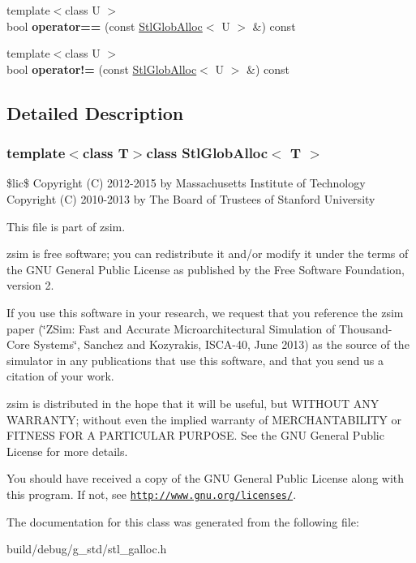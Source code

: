\begin{DoxyCompactItemize}
\item 
\hypertarget{classStlGlobAlloc_af3c45b58386a804323f79d1664b8641c}{{\footnotesize template$<$class U $>$ }\\bool {\bfseries operator==} (const \hyperlink{classStlGlobAlloc}{Stl\-Glob\-Alloc}$<$ U $>$ \&) const }\label{classStlGlobAlloc_af3c45b58386a804323f79d1664b8641c}

\item 
\hypertarget{classStlGlobAlloc_abf98d4b1fd59bc77b1ecbe82c2917520}{{\footnotesize template$<$class U $>$ }\\bool {\bfseries operator!=} (const \hyperlink{classStlGlobAlloc}{Stl\-Glob\-Alloc}$<$ U $>$ \&) const }\label{classStlGlobAlloc_abf98d4b1fd59bc77b1ecbe82c2917520}

\end{DoxyCompactItemize}


\subsection{Detailed Description}
\subsubsection*{template$<$class T$>$class Stl\-Glob\-Alloc$<$ T $>$}

\$lic\$ Copyright (C) 2012-\/2015 by Massachusetts Institute of Technology Copyright (C) 2010-\/2013 by The Board of Trustees of Stanford University

This file is part of zsim.

zsim is free software; you can redistribute it and/or modify it under the terms of the G\-N\-U General Public License as published by the Free Software Foundation, version 2.

If you use this software in your research, we request that you reference the zsim paper (\char`\"{}\-Z\-Sim\-: Fast and Accurate Microarchitectural Simulation of
\-Thousand-\/\-Core Systems\char`\"{}, Sanchez and Kozyrakis, I\-S\-C\-A-\/40, June 2013) as the source of the simulator in any publications that use this software, and that you send us a citation of your work.

zsim is distributed in the hope that it will be useful, but W\-I\-T\-H\-O\-U\-T A\-N\-Y W\-A\-R\-R\-A\-N\-T\-Y; without even the implied warranty of M\-E\-R\-C\-H\-A\-N\-T\-A\-B\-I\-L\-I\-T\-Y or F\-I\-T\-N\-E\-S\-S F\-O\-R A P\-A\-R\-T\-I\-C\-U\-L\-A\-R P\-U\-R\-P\-O\-S\-E. See the G\-N\-U General Public License for more details.

You should have received a copy of the G\-N\-U General Public License along with this program. If not, see \href{http://www.gnu.org/licenses/}{\tt http\-://www.\-gnu.\-org/licenses/}. 

The documentation for this class was generated from the following file\-:\begin{DoxyCompactItemize}
\item 
build/debug/g\-\_\-std/stl\-\_\-galloc.\-h\end{DoxyCompactItemize}
